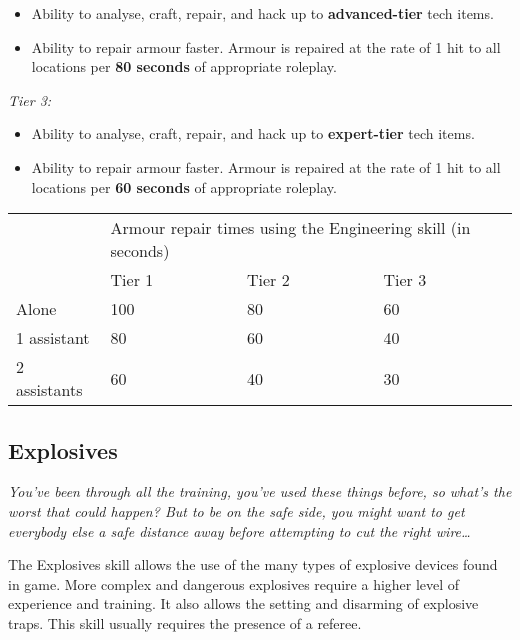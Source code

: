 \begin{itemize}
\item Ability to analyse, craft, repair, and hack up to \textbf{advanced-tier} tech items.

\item Ability to repair armour faster. Armour is repaired at the rate of 1 hit to all locations per \textbf{80 seconds} of appropriate roleplay.

\end{itemize}
\textit{Tier 3:}

\begin{itemize}
\item Ability to analyse, craft, repair, and hack up to \textbf{expert-tier} tech items.

\item Ability to repair armour faster. Armour is repaired at the rate of 1 hit to all locations per \textbf{60 seconds} of appropriate roleplay.

\end{itemize}

\begin{table}[H]
\begin{tabular}{|l|l|l|l|} \hline 
\multirow{1}{*}{}& \multicolumn{3}{|l|}{Armour repair times using the Engineering skill (in seconds)} \\
\cline{2-2}\cline{3-3}\cline{4-4} & Tier 1 & Tier 2 & Tier 3 \\
 \hline Alone & 100 & 80 & 60 \\
 \hline 1 assistant & 80 & 60 & 40 \\
 \hline 2 assistants & 60 & 40 & 30 \\
 \hline \end{tabular}

\end{table}

\subsection{Explosives}

\textit{You've been through all the training, you've used these things before, so what's the worst that could happen? But to be on the safe side, you might want to get everybody else a safe distance away before attempting to cut the right wire{\dots}}

The Explosives skill allows the use of the many types of explosive devices found in game. More complex and dangerous explosives require a higher level of experience and training. It also allows the setting and disarming of explosive traps. This skill usually requires the presence of a referee.

